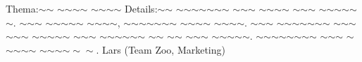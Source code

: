 
%
	{Thema:}{$\sim$$\sim$ $\sim$$\sim$$\sim$$\sim$ $\sim$$\sim$$\sim$$\sim$}%
	{Details:}{$\sim$$\sim$ $\sim$$\sim$$\sim$$\sim$$\sim$$\sim$$\sim$ $\sim$$\sim$$\sim$ $\sim$$\sim$$\sim$$\sim$ $\sim$$\sim$$\sim$ $\sim$$\sim$$\sim$$\sim$$\sim$$\sim$. $\sim$$\sim$$\sim$ $\sim$$\sim$$\sim$$\sim$$\sim$ $\sim$$\sim$$\sim$$\sim$, $\sim$$\sim$$\sim$$\sim$$\sim$$\sim$$\sim$ $\sim$$\sim$$\sim$$\sim$ $\sim$$\sim$$\sim$$\sim$. $\sim$$\sim$$\sim$ $\sim$$\sim$$\sim$$\sim$$\sim$$\sim$$\sim$ $\sim$$\sim$$\sim$ $\sim$$\sim$$\sim$ $\sim$$\sim$$\sim$$\sim$$\sim$ $\sim$$\sim$$\sim$ $\sim$$\sim$$\sim$$\sim$$\sim$$\sim$ $\sim$$\sim$ $\sim$$\sim$ $\sim$$\sim$$\sim$ $\sim$$\sim$$\sim$$\sim$$\sim$. $\sim$$\sim$$\sim$$\sim$$\sim$$\sim$$\sim$$\sim$ $\sim$$\sim$$\sim$ $\sim$$\sim$$\sim$$\sim$$\sim$ $\sim$$\sim$$\sim$$\sim\sim\sim$.}
	{Lars (Team Zoo, Marketing)}